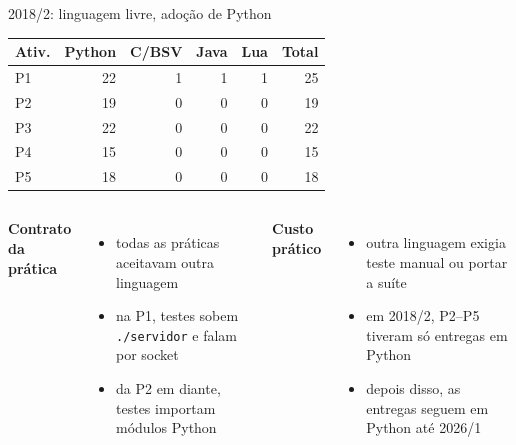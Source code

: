 \documentclass[aspectratio=169,11pt]{beamer}
\newcommand{\eyebrow}[1]{{\color{caipyraOrange}\small\bfseries #1}\par\vspace{0.25em}}
\newenvironment{tightitemize}{%
  \begin{itemize}\setlength{\itemsep}{0.25em}\setlength{\parskip}{0pt}
}{\end{itemize}}
\begin{document}
\begin{frame}{2018/2: linguagem livre, adoção de Python}
  \centering
  {\footnotesize
  \begin{tabular}{lrrrrr}
    \toprule
    Ativ. & Python & C/BSV & Java & Lua & Total\\
    \midrule
    P1 & 22 & 1 & 1 & 1 & 25\\
    P2 & 19 & 0 & 0 & 0 & 19\\
    P3 & 22 & 0 & 0 & 0 & 22\\
    P4 & 15 & 0 & 0 & 0 & 15\\
    P5 & 18 & 0 & 0 & 0 & 18\\
    \bottomrule
  \end{tabular}
  }

  \vspace{0.9em}
  \begin{columns}[T,onlytextwidth]
    \eyebrow{Contrato da prática}
    \begin{tightitemize}
      \item todas as práticas aceitavam outra linguagem
      \item na P1, testes sobem \texttt{./servidor} e falam por socket
      \item da P2 em diante, testes importam módulos Python
    \end{tightitemize}

    \eyebrow{Custo prático}
    \begin{tightitemize}
      \item outra linguagem exigia teste manual ou portar a suíte
      \item em 2018/2, P2--P5 tiveram só entregas em Python
      \item depois disso, as entregas seguem em Python até 2026/1
    \end{tightitemize}
  \end{columns}
\end{frame}
\end{document}
